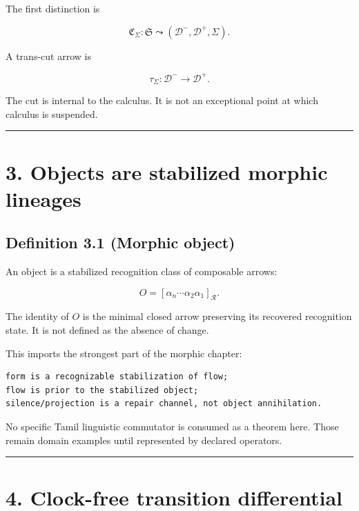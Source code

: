 The first distinction is

\[
\mathfrak C_\Sigma:
\mathfrak S\leadsto
(\mathcal D^-,\mathcal D^+,\Sigma).
\]

A trans-cut arrow is

\[
\tau_\Sigma:\mathcal D^-\longrightarrow\mathcal D^+.
\]

The cut is internal to the calculus. It is not an exceptional point at which
calculus is suspended.

\begin{center}\rule{0.5\linewidth}{0.5pt}\end{center}

\hypertarget{objects-are-stabilized-morphic-lineages}{%
\section{3. Objects are stabilized morphic lineages}\label{objects-are-stabilized-morphic-lineages}}

\hypertarget{definition-3.1-morphic-object}{%
\subsection{Definition 3.1 (Morphic object)}\label{definition-3.1-morphic-object}}

An object is a stabilized recognition class of composable arrows:

\[
\boxed{
O=
[\alpha_n\cdots\alpha_2\alpha_1]_{\mathcal R}.
}
\]

The identity of \(O\) is the minimal closed arrow preserving its recovered
recognition state. It is not defined as the absence of change.

This imports the strongest part of the morphic chapter:

\begin{verbatim}
form is a recognizable stabilization of flow;
flow is prior to the stabilized object;
silence/projection is a repair channel, not object annihilation.
\end{verbatim}

No specific Tamil linguistic commutator is consumed as a theorem here. Those
remain domain examples until represented by declared operators.

\begin{center}\rule{0.5\linewidth}{0.5pt}\end{center}

\hypertarget{clock-free-transition-differential}{%
\section{4. Clock-free transition differential}\label{clock-free-transition-differential}}


